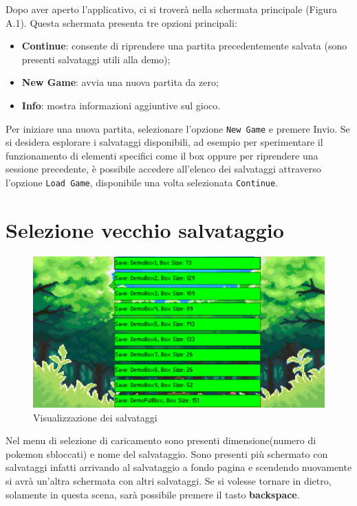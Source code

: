 \documentclass[a4paper,12pt]{report}
\begin{document}
{{Dopo aver aperto l’applicativo, ci si troverà nella schermata principale (Figura A.1).  
Questa schermata presenta tre opzioni principali:

\begin{itemize}
  \item \textbf{Continue}: consente di riprendere una partita precedentemente salvata (sono presenti salvataggi utili alla demo);
  \item \textbf{New Game}: avvia una nuova partita da zero;
  \item \textbf{Info}: mostra informazioni aggiuntive sul gioco.
\end{itemize}

Per iniziare una nuova partita, selezionare l'opzione \texttt{New Game} e premere Invio.
Se si desidera esplorare i salvataggi disponibili, ad esempio per sperimentare il funzionamento di elementi specifici come il box oppure per riprendere una sessione precedente, è possibile accedere all’elenco dei salvataggi attraverso l’opzione \texttt{Load Game}, disponibile una volta selezionata \texttt{Continue}.

\section{Selezione vecchio salvataggio}

\begin{figure}[H]
  \centering
  \includegraphics[width=\textwidth]{immagini/schermataLoad.png}
  \caption{Visualizzazione dei salvataggi}
  \label{fig:load_screen}
\end{figure}

Nel menu di selezione di caricamento sono presenti dimensione(numero di pokemon sbloccati) e nome del salvataggio.
Sono presenti più schermato con salvataggi infatti arrivando al salvataggio a fondo pagina e scendendo nuovamente si avrà un'altra schermata con altri salvataggi.
Se si volesse tornare in dietro, solamente in questa scena, sarà possibile premere il tasto \textbf{backspace}.


}}
\end{document}
